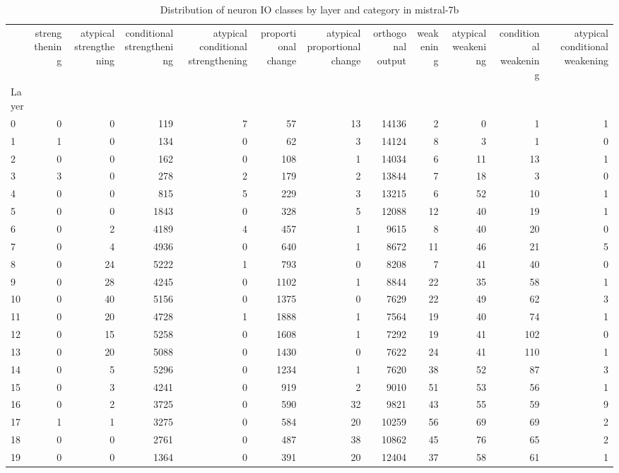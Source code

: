 \begin{table}
\caption{Distribution of neuron IO classes by layer and category in mistral-7b}
\label{tab:mistral-7b}
\begin{tabular}{lrrrrrrrrrrr}
 & strengthening & atypical strengthening & conditional strengthening & atypical conditional strengthening & proportional change & atypical proportional change & orthogonal output & weakening & atypical weakening & conditional weakening & atypical conditional weakening \\
Layer &  &  &  &  &  &  &  &  &  &  &  \\
0 & 0 & 0 & 119 & 7 & 57 & 13 & 14136 & 2 & 0 & 1 & 1 \\
1 & 1 & 0 & 134 & 0 & 62 & 3 & 14124 & 8 & 3 & 1 & 0 \\
2 & 0 & 0 & 162 & 0 & 108 & 1 & 14034 & 6 & 11 & 13 & 1 \\
3 & 3 & 0 & 278 & 2 & 179 & 2 & 13844 & 7 & 18 & 3 & 0 \\
4 & 0 & 0 & 815 & 5 & 229 & 3 & 13215 & 6 & 52 & 10 & 1 \\
5 & 0 & 0 & 1843 & 0 & 328 & 5 & 12088 & 12 & 40 & 19 & 1 \\
6 & 0 & 2 & 4189 & 4 & 457 & 1 & 9615 & 8 & 40 & 20 & 0 \\
7 & 0 & 4 & 4936 & 0 & 640 & 1 & 8672 & 11 & 46 & 21 & 5 \\
8 & 0 & 24 & 5222 & 1 & 793 & 0 & 8208 & 7 & 41 & 40 & 0 \\
9 & 0 & 28 & 4245 & 0 & 1102 & 1 & 8844 & 22 & 35 & 58 & 1 \\
10 & 0 & 40 & 5156 & 0 & 1375 & 0 & 7629 & 22 & 49 & 62 & 3 \\
11 & 0 & 20 & 4728 & 1 & 1888 & 1 & 7564 & 19 & 40 & 74 & 1 \\
12 & 0 & 15 & 5258 & 0 & 1608 & 1 & 7292 & 19 & 41 & 102 & 0 \\
13 & 0 & 20 & 5088 & 0 & 1430 & 0 & 7622 & 24 & 41 & 110 & 1 \\
14 & 0 & 5 & 5296 & 0 & 1234 & 1 & 7620 & 38 & 52 & 87 & 3 \\
15 & 0 & 3 & 4241 & 0 & 919 & 2 & 9010 & 51 & 53 & 56 & 1 \\
16 & 0 & 2 & 3725 & 0 & 590 & 32 & 9821 & 43 & 55 & 59 & 9 \\
17 & 1 & 1 & 3275 & 0 & 584 & 20 & 10259 & 56 & 69 & 69 & 2 \\
18 & 0 & 0 & 2761 & 0 & 487 & 38 & 10862 & 45 & 76 & 65 & 2 \\
19 & 0 & 0 & 1364 & 0 & 391 & 20 & 12404 & 37 & 58 & 61 & 1 \\

\end{tabular}
\end{table}
